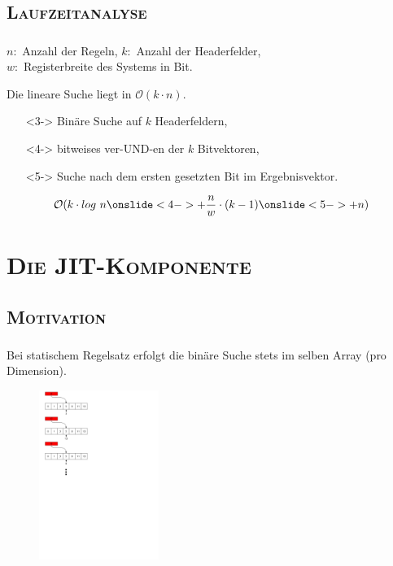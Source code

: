 \documentclass[xcolor=x11names,compress]{beamer}
\renewcommand{\(}{\begin{columns}}
\renewcommand{\)}{\end{columns}}
\newcommand{\<}[1]{\begin{column}{#1}}
\renewcommand{\>}{\end{column}}
\begin{document}
\subsection{\scshape Laufzeitanalyse}
\begin{frame}
  \frametitle{\insertsubsection}
  $n:$ Anzahl der Regeln, $k:$ Anzahl der Headerfelder,\\$w:$ Registerbreite des Systems in Bit.
  \pause
  \begin{tcolorbox}[colback=red!5!white,colframe=red!75!black,title=Erinnerung: Lineare Suche,drop fuzzy shadow]
  Die lineare Suche liegt in $\mathcal O(k \cdot n)$.
  \end{tcolorbox}
  \pause
  \begin{tcolorbox}[colback=teal!5!white,colframe=teal!75!black,title=Bitvector-Algorithmus,drop fuzzy shadow]
  \begin{itemize}[leftmargin=0cm]
    \item[]<3-> Binäre Suche auf $k$ Headerfeldern,
    \item[]<4-> bitweises ver-UND-en der $k$ Bitvektoren,
    \item[]<5-> Suche nach dem ersten gesetzten Bit im Ergebnisvektor.
  \end{itemize}
  \centering
  \begin{equation*}
  \mathcal O(k \cdot log\ n \onslide<4->{+ \frac{n}{w} \cdot (k - 1)} \onslide<5->{ + n})
  \end{equation*}
  \end{tcolorbox}
\end{frame}

\section{\scshape Die JIT-Komponente}
\begin{frame}
  \centering\Huge{\insertsection}
\end{frame}

\subsection{\scshape Motivation}
\begin{frame}
  \frametitle{\insertsubsection}
  Bei statischem Regelsatz erfolgt die binäre Suche stets im selben Array (pro Dimension).\\
  \begin{figure}
  \centering
  \includegraphics[height=5.5cm]{figures/matching_process}
  \end{figure}
\end{frame}
\end{document}
